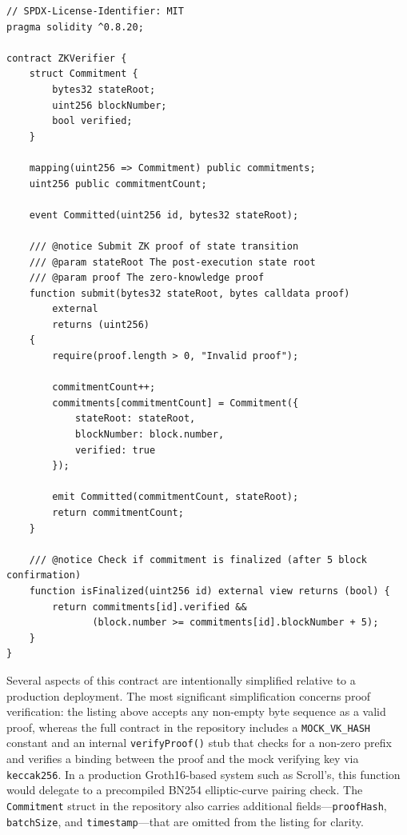 \begin{listing}[H]
    \begin{verbatim}
// SPDX-License-Identifier: MIT
pragma solidity ^0.8.20;

contract ZKVerifier {
    struct Commitment {
        bytes32 stateRoot;
        uint256 blockNumber;
        bool verified;
    }

    mapping(uint256 => Commitment) public commitments;
    uint256 public commitmentCount;
    
    event Committed(uint256 id, bytes32 stateRoot);

    /// @notice Submit ZK proof of state transition
    /// @param stateRoot The post-execution state root
    /// @param proof The zero-knowledge proof
    function submit(bytes32 stateRoot, bytes calldata proof) 
        external 
        returns (uint256) 
    {
        require(proof.length > 0, "Invalid proof");
        
        commitmentCount++;
        commitments[commitmentCount] = Commitment({
            stateRoot: stateRoot,
            blockNumber: block.number,
            verified: true
        });
        
        emit Committed(commitmentCount, stateRoot);
        return commitmentCount;
    }

    /// @notice Check if commitment is finalized (after 5 block confirmation)
    function isFinalized(uint256 id) external view returns (bool) {
        return commitments[id].verified && 
               (block.number >= commitments[id].blockNumber + 5);
    }
}
    \end{verbatim}
    \caption{ZKVerifier.sol - Solidity implementation}
    \label{lst:zkverifier}
\end{listing}

Several aspects of this contract are intentionally simplified relative to a production deployment. The most significant simplification concerns proof verification: the listing above accepts any non-empty byte sequence as a valid proof, whereas the full contract in the repository includes a \texttt{MOCK\_VK\_HASH} constant and an internal \texttt{verifyProof()} stub that checks for a non-zero prefix and verifies a binding between the proof and the mock verifying key via \texttt{keccak256}. In a production Groth16-based system such as Scroll's, this function would delegate to a precompiled BN254 elliptic-curve pairing check. The \texttt{Commitment} struct in the repository also carries additional fields---\texttt{proofHash}, \texttt{batchSize}, and \texttt{timestamp}---that are omitted from the listing for clarity.

